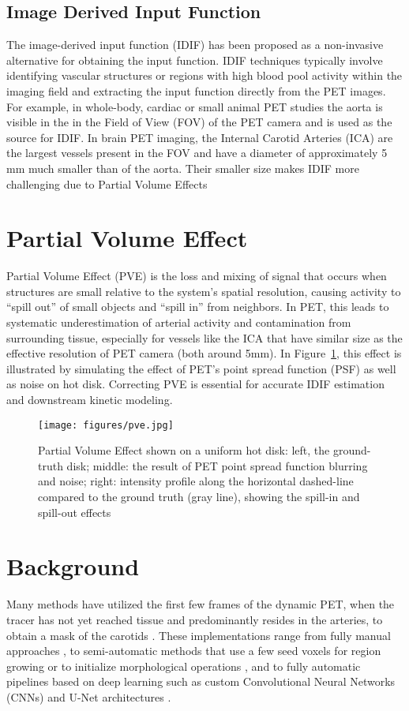 \subsection{Image Derived Input Function}
The image-derived input function (IDIF) has been proposed as a non-invasive alternative for obtaining the input function.
IDIF techniques typically involve identifying vascular structures or regions with high blood pool activity within the imaging field and extracting the input function directly from the PET images.
For example, in whole-body, cardiac or small animal PET studies the aorta is visible in the in the Field of View (FOV) of the PET camera and is used as the source for IDIF.
In brain PET imaging, the Internal Carotid Arteries (ICA) are the largest vessels present in the FOV and have a diameter of approximately 5 mm much smaller than of the aorta.
Their smaller size makes IDIF more challenging due to Partial Volume Effects

\section{Partial Volume Effect}
Partial Volume Effect (PVE) is the loss and mixing of signal that occurs when structures are small relative to the system’s spatial resolution, causing activity to “spill out” of small objects and “spill in” from neighbors.
In PET, this leads to systematic underestimation of arterial activity and contamination from surrounding tissue, especially for vessels like the ICA that have similar size as the effective resolution of PET camera (both around 5mm).
In Figure~\ref{fig:pve}, this effect is illustrated by simulating the effect of PET's point spread function (PSF) as well as noise on hot disk.
Correcting PVE is essential for accurate IDIF estimation and downstream kinetic modeling.

\begin{figure}[h]
	\texttt{[image: figures/pve.jpg]}
	\caption{Partial Volume Effect shown on a uniform hot disk: left, the ground-truth disk; middle: the result of PET point spread function blurring and noise; right: intensity profile along the horizontal dashed-line compared to the ground truth (gray line), showing the spill-in and spill-out effects}
	\label{fig:pve}
\end{figure}
\section{Background}
Many methods have utilized the first few frames of the dynamic PET, when the tracer has not yet reached tissue and predominantly resides in the arteries, to obtain a mask of the carotids \cite{young2023image}.
These implementations range from fully manual approaches \cite{feng2015image}, to semi-automatic methods that use a few seed voxels for region growing or to initialize morphological operations \cite{dassanayake2022caliper,vestergaard2021validation}, and to fully automatic pipelines based on deep learning such as custom Convolutional Neural Networks (CNNs) \cite{ferrante2024physically,chen2025deep} and U-Net architectures \cite{chavan2024end}.

